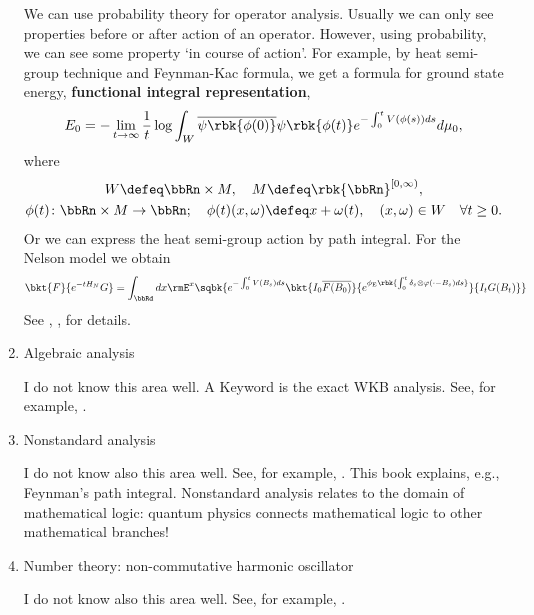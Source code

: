 \documentclass[openany, a4paper, oneside]{jsbook}
\begin{document}
\begin{enumerate}
We can use probability theory for operator analysis.
Usually we can only see properties before or after action of an operator.
However, using probability, we can see some property `in course of action'.
For example, by heat semi-group technique and Feynman-Kac formula, we get a formula for ground state energy,
\textbf{functional integral representation},
\begin{align}
 E_0
 =
 -\lim_{t \to \infty} \frac{1}{t} \log \int_{W} \overline{\psi \rbk{\phi (0)}} \psi \rbk{\phi (t)} e^{- \int_0^t V (\phi (s)) ds} d\mu_0,
\end{align}
where
\begin{gather}
 W
 \defeq
 \bbRn \times M, \quad
 M
 \defeq
 \rbk{\bbRn}^{[0, \infty)}, \\
 \phi (t) \colon \bbRn \times M \to \bbRn; \quad
 \phi (t) (x, \omega) \defeq x + \omega (t), \quad (x, \omega) \in W \quad \forall t \geq 0.
\end{gather}
Or we can express the heat semi-group action by path integral.
For the Nelson model we obtain
\begin{align}
 \bkt{F}{e^{- t H_N} G}
 =
 \int_{\bbRd} dx \rmE^{x}
 \sqbk{e^{- \int_0^t V (B_s) ds} \bkt{I_0 \overline{F (B_0)}}{e^{\phi_{\mathrm{E}} \rbk{\int_0^t \delta_s \otimes \varphi (\cdot - B_s) ds}}}{I_t G (B_t)}}
\end{align}
See \cite{LorincziHiroshimaBetz1}, \cite{AsaoArai5}, \cite{SimonBarry2} for details.
\item Algebraic analysis

I do not know this area well.
A Keyword is the exact WKB analysis.
See, for example, \cite{KawaiTakei1}.
\item Nonstandard analysis

I do not know also this area well.
See, for example, \cite{TohruNakamura1}.
This book explains, e.g., Feynman's path integral.
Nonstandard analysis relates to the domain of mathematical logic:
quantum physics connects mathematical logic to other mathematical branches!
\item Number theory: non-commutative harmonic oscillator

I do not know also this area well.
See, for example, \cite{AlbertoParmeggiani1, MasatoWakayama1}.


\end{enumerate}
\end{document}
